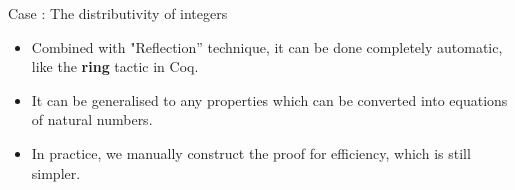 \documentclass[11pt, mathserif,handout]{beamer}
\begin{document}
\begin{frame}[allowframebreaks,t]{Case : The distributivity of
    integers}
\begin{itemize}
\item Combined with "Reflection'' technique, it can be done completely
  automatic, like the \textbf{ring} tactic in Coq.

\item It can be generalised to any properties which can be converted
into equations of natural numbers.

\item In practice, we manually construct the proof for efficiency,
  which is still simpler.

\begin{code}
\\
\> \AgdaSymbol{:}   \<%
\\
\> \AgdaSymbol{(} \AgdaInductiveConstructor{,} \AgdaSymbol{)} \AgdaSymbol{(} \AgdaInductiveConstructor{,} \AgdaSymbol{)} \AgdaSymbol{(} \AgdaInductiveConstructor{,} \AgdaSymbol{)} \AgdaSymbol{=} \<[32]%
\>[32]\<%
\\
\>[0]\<[2]%
\>[2]  \AgdaSymbol{(}      \AgdaSymbol{)}\<%
\\
\>[0]\<[2]%
\>[2]\AgdaSymbol{(} \AgdaSymbol{(}      \AgdaSymbol{))}\<%
\\
%
\\
\> \AgdaSymbol{:}         \<[28]%
\>[28]\<%
\\
\>[0]\<[2]%
\>[2]  \AgdaSymbol{(}  \AgdaSymbol{)}    \AgdaSymbol{(}  \AgdaSymbol{)} \<%
\\
\>[0]\<[2]%
\>[2]\AgdaSymbol{(}      \AgdaSymbol{)}  \AgdaSymbol{(}      \AgdaSymbol{)} \<[43]%

\end{code}
\end{itemize}
\end{frame}
\end{document}
